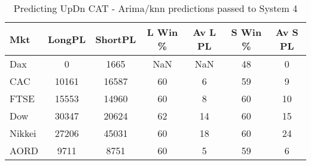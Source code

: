 \begin{table}[ht]
\centering
\caption[Predicting UpDn CAT - Arima/knn predictions passed to System 4.]{Predicting UpDn CAT - Arima/knn predictions passed to System 4} 
\label{tab:chp_ts:pUD_CAT_arima_knn_sys}
\begin{tabular}{lcccccc}
  \toprule Mkt & LongPL & ShortPL & L Win \% & Av L PL & S Win \% & Av S PL \\ 
  \midrule Dax & 0 & 1665 & NaN & NaN & 48 & 0 \\ 
  CAC & 10161 & 16587 & 60 & 6 & 59 & 9 \\ 
  FTSE & 15553 & 14960 & 60 & 8 & 60 & 10 \\ 
  Dow & 30347 & 20624 & 62 & 14 & 60 & 15 \\ 
  Nikkei & 27206 & 45031 & 60 & 18 & 60 & 24 \\ 
  AORD & 9711 & 8751 & 60 & 5 & 59 & 6 \\ 
   \bottomrule \end{tabular}
\end{table}
